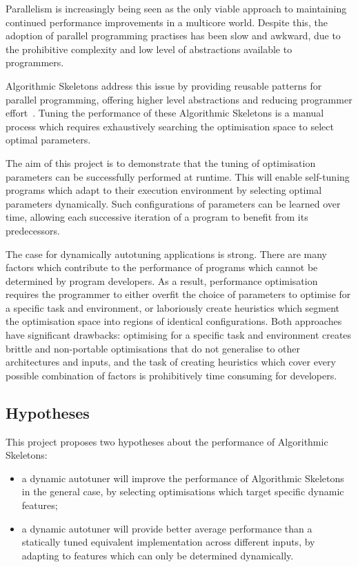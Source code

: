Parallelism is increasingly being seen as the only viable approach to
maintaining continued performance improvements in a multicore
world. Despite this, the adoption of parallel programming practises
has been slow and awkward, due to the prohibitive complexity and low
level of abstractions available to programmers.

Algorithmic Skeletons address this issue by providing reusable
patterns for parallel programming, offering higher level abstractions
and reducing programmer effort~\cite{Cole1989, Cole2004}. Tuning the
performance of these Algorithmic Skeletons is a manual process which
requires exhaustively searching the optimisation space to select
optimal parameters.

The aim of this project is to demonstrate that the tuning of
optimisation parameters can be successfully performed at runtime. This
will enable self-tuning programs which adapt to their execution
environment by selecting optimal parameters dynamically. Such
configurations of parameters can be learned over time, allowing each
successive iteration of a program to benefit from its predecessors.

The case for dynamically autotuning applications is strong. There are
many factors which contribute to the performance of programs which
cannot be determined by program developers.
As a result, performance optimisation requires the programmer to
either overfit the choice of parameters to optimise for a specific
task and environment, or laboriously create heuristics which segment
the optimisation space into regions of identical configurations. Both
approaches have significant drawbacks: optimising for a specific task
and environment creates brittle and non-portable optimisations that do
not generalise to other architectures and inputs, and the task of
creating heuristics which cover every possible combination of factors
is prohibitively time consuming for developers.

\subsection{Hypotheses}
This project proposes two hypotheses about the performance of
Algorithmic Skeletons:
\begin{itemize}
\item a dynamic autotuner will improve the performance of Algorithmic
  Skeletons in the general case, by selecting optimisations which
  target specific dynamic features;
\item a dynamic autotuner will provide better average performance than
  a statically tuned equivalent implementation across different
  inputs, by adapting to features which can only be determined
  dynamically.
\end{itemize}


